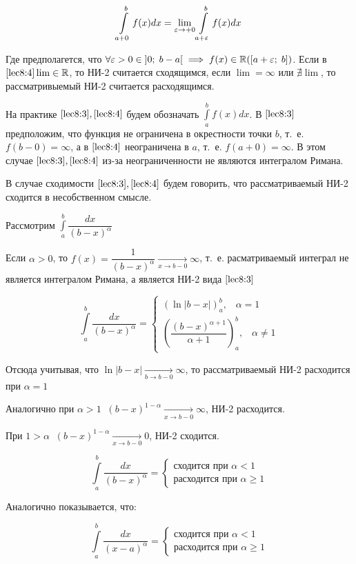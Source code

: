 \documentclass[../../main.tex]{subfiles}
\begin{document}
\begin{equation} \label{lec8:4}
 \int\limits_{a + 0}^{b}f(x)dx = \underset{\varepsilon \to +0}\lim \int\limits_{a + \varepsilon}^{b}f(x)dx
\end{equation}

Где предполагется, что $\forall \varepsilon > 0 \in \left]0;\; b - a\right[ \implies f(x) \in \mathbb{R}(\left[a + \varepsilon;\; b\right])$. Если в $\eqref{lec8:4} \lim \in \mathbb{R}$, то НИ-2 считается сходящимся, если $\lim = \infty$ или $\nexists \lim$, то рассматривыемый НИ-2 считается расходящимся.

На практике $\eqref{lec8:3}, \eqref{lec8:4}$ будем обозначать $\displaystyle\int\limits_{a}^{b}f(x)dx$. В $\eqref{lec8:3}$ предположим, что функция не ограничена в окрестности точки $b$, т.~е. $f(b - 0) = \infty$, а в $\eqref{lec8:4}$ неограничена в $a$, т.~е. $f(a + 0) = \infty$. В этом случае $\eqref{lec8:3}, \eqref{lec8:4}$ из-за неограниченности не являются интегралом Римана.

В случае сходимости $\eqref{lec8:3}, \eqref{lec8:4}$ будем говорить, что рассматриваемый НИ-2 сходится в несобственном смысле.

\begin{exmp}
 Рассмотрим $\displaystyle\int\limits_{a}^{b}\dfrac{dx}{(b - x)^{\alpha}}$
 
 Если $\alpha > 0$, то $f(x) = \dfrac{1}{(b -x)^{\alpha}} \xrightarrow[x \to b - 0]{} \infty$, т.~е. расматриваемый интеграл не является интегралом Римана, а является НИ-2 вида $\eqref{lec8:3}$
 
 \[\int\limits_{a}^{b}\dfrac{dx}{(b - x)^{\alpha}} =
 \begin{cases}
 \left(\ln|b - x|\right)_{a}^{b},\;\;\; \alpha = 1\\
 \left(\dfrac{(b - x)^{\alpha + 1}}{\alpha + 1}\right)_{a}^{b},\;\;\; \alpha \neq 1                                               
\end{cases}\]

Отсюда учитывая, что $\ln|b - x| \xrightarrow[b \to b - 0]{} \infty$, то рассматриваемый НИ-2 расходится при $\alpha = 1$

Аналогично при $\alpha > 1 \;\;(b - x)^{1- \alpha} \xrightarrow[x \to b - 0]{} \infty$, НИ-2 расходится.

При $1 > \alpha \;\; (b - x)^{1 - \alpha} \xrightarrow[x \to b - 0]{} 0$, НИ-2 сходится.

\[\int\limits_{a}^{b} \dfrac{dx}{(b - x)^{\alpha}} = 
\begin{cases}
\text{сходится при } \alpha < 1\\
\text{расходится при } \alpha \geq 1
\end{cases}\]

Аналогично показывается, что:

\[\int\limits_{a}^{b} \dfrac{dx}{(x - a)^{\alpha}} = 
\begin{cases}
\text{сходится при } \alpha < 1\\
\text{расходится при } \alpha \geq 1
\end{cases}\]
\end{exmp}
\end{document}
